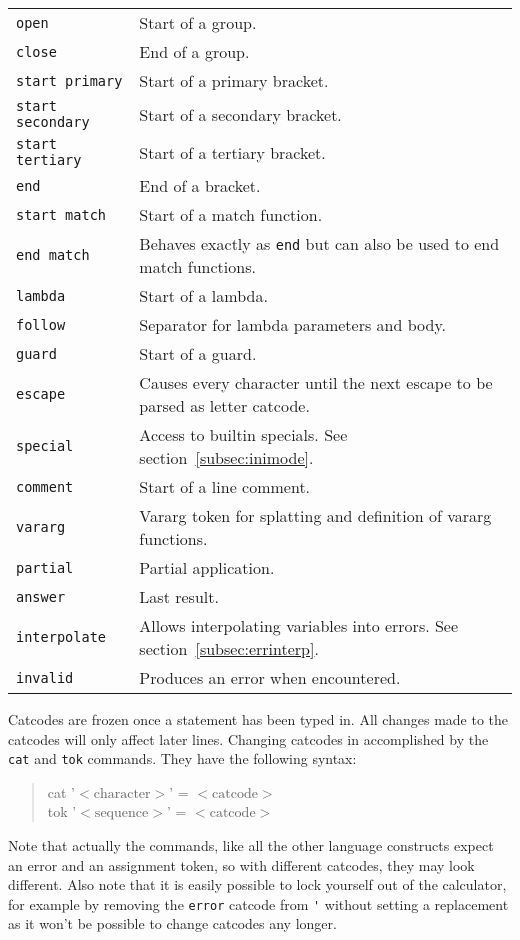 \documentclass[10pt]{article}
\newcommand{\argument}[1]{{${\big<}\mathrm{#1}{\big>}$}}
\newenvironment{code}{\begin{quote}\ttfamily}{\end{quote}}
\begin{document}
\begin{longtable}{p{}p{}}
        \verb|open|            & Start of a group. \\
        \verb|close|           & End of a group. \\
        \verb|start primary|   & Start of a primary bracket. \\
        \verb|start secondary| & Start of a secondary bracket. \\
        \verb|start tertiary|  & Start of a tertiary bracket. \\
        \verb|end|             & End of a bracket. \\
        \verb|start match|     & Start of a match function. \\
        \verb|end match|       & Behaves exactly as \verb|end| but can also be used to end match functions. \\
        \verb|lambda|          & Start of a lambda. \\
        \verb|follow|          & Separator for lambda parameters and body. \\
        \verb|guard |          & Start of a guard. \\
        \verb|escape|          & Causes every character until the next escape to be parsed as letter catcode. \\
        \verb|special|         & Access to builtin specials. See section~\ref{subsec:inimode}. \\
        \verb|comment|         & Start of a line comment. \\
        \verb|vararg|          & Vararg token for splatting and definition of vararg functions. \\
        \verb|partial|         & Partial application. \\
        \verb|answer|          & Last result. \\
        \verb|interpolate|     & Allows interpolating variables into errors. See section~\ref{subsec:errinterp}. \\
        \verb|invalid|         & Produces an error when encountered. \\
    \end{longtable}
    Catcodes are frozen once a statement has been typed in.
    All changes made to the catcodes will only affect later lines.
    Changing catcodes in accomplished by the \verb|cat| and \verb|tok| commands.
    They have the following syntax:
    \begin{code}
        cat '\argument{character}' = \argument{catcode} \\
        tok '\argument{sequence}' = \argument{catcode}
    \end{code}
    Note that actually the commands, like all the other language constructs expect an error and an assignment token, so with different catcodes, they may look different.
    Also note that it is easily possible to lock yourself out of the calculator, for example by removing the \verb|error| catcode from \verb|'| without setting a replacement as it won't be possible to change catcodes any longer.
    
\end{document}
